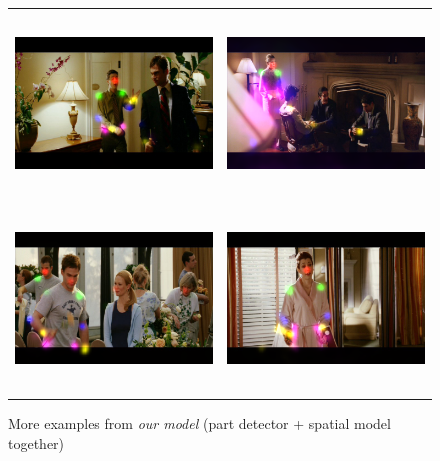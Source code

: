 \documentclass[a4paper,10pt]{article}
\begin{document}
\begin{figure}[H]
\begin{tabular}{cc}
			\includegraphics[height=4.9cm]{img/ap_sm5.png} & 
			\includegraphics[height=4.9cm]{img/ap_sm6.png} \\
			\includegraphics[height=4.9cm]{img/ap_sm7.png} &
			\includegraphics[height=4.9cm]{img/ap_sm8.png}
			\caption{More examples from \textit{our model} (part detector + spatial model together)}
			\label{appendix}
		\end{tabular}
	\end{figure}
	
\end{document}
